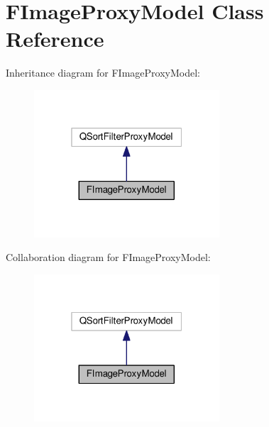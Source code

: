 \hypertarget{classFImageProxyModel}{}\section{F\+Image\+Proxy\+Model Class Reference}
\label{classFImageProxyModel}


Inheritance diagram for F\+Image\+Proxy\+Model\+:
\nopagebreak
\begin{figure}[H]
\begin{center}
\leavevmode
\includegraphics[width=196pt]{classFImageProxyModel__inherit__graph}
\end{center}
\end{figure}


Collaboration diagram for F\+Image\+Proxy\+Model\+:
\nopagebreak
\begin{figure}[H]
\begin{center}
\leavevmode
\includegraphics[width=196pt]{classFImageProxyModel__coll__graph}
\end{center}
\end{figure}
